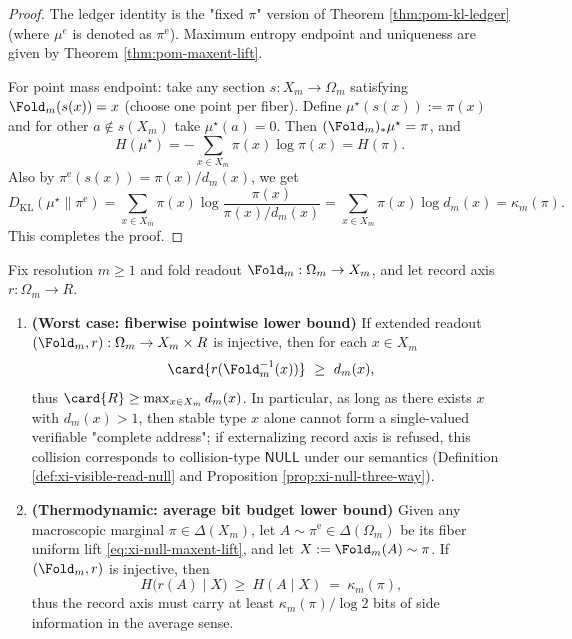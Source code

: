 \begin{proof}
The ledger identity is the "fixed \(\pi\)" version of Theorem \ref{thm:pom-kl-ledger} (where \(\mu^e\) is denoted as \(\pi^{\mathrm{e}}\)).
Maximum entropy endpoint and uniqueness are given by Theorem \ref{thm:pom-maxent-lift}.
\par
For point mass endpoint: take any section \(s:X_m\to\Omega_m\) satisfying \(\Fold_m(s(x))=x\) (choose one point per fiber).
Define
\(
\mu^\star(s(x)):=\pi(x)
\)
and for other \(a\notin s(X_m)\) take \(\mu^\star(a)=0\).
Then \((\Fold_m)_*\mu^\star=\pi\), and
\[
H(\mu^\star)=-\sum_{x\in X_m}\pi(x)\log\pi(x)=H(\pi).
\]
Also by \(\pi^{\mathrm{e}}(s(x))=\pi(x)/d_m(x)\), we get
\[
D_{\mathrm{KL}}(\mu^\star\|\pi^{\mathrm{e}})
=\sum_{x\in X_m}\pi(x)\log\frac{\pi(x)}{\pi(x)/d_m(x)}
=\sum_{x\in X_m}\pi(x)\log d_m(x)
=\kappa_m(\pi).
\]
This completes the proof.
\end{proof}

\begin{theorem}\label{thm:address-defect-law}
Fix resolution \(m\ge 1\) and fold readout \(\Fold_m:\Omega_m\to X_m\), and let record axis \(r:\Omega_m\to R\).
\begin{enumerate}
  \item \textbf{(Worst case: fiberwise pointwise lower bound)} If extended readout \((\Fold_m,r):\Omega_m\to X_m\times R\) is injective, then for each \(x\in X_m\)
  \[
  \card{r(\Fold_m^{-1}(x))}\ \ge\ d_m(x),
  \]
  thus \(\card{R}\ge \max_{x\in X_m} d_m(x)\).
  In particular, as long as there exists \(x\) with \(d_m(x)>1\), then stable type \(x\) alone cannot form a single-valued verifiable "complete address"; if externalizing record axis is refused, this collision corresponds to collision-type \(\mathsf{NULL}\) under our semantics (Definition \ref{def:xi-visible-read-null} and Proposition \ref{prop:xi-null-three-way}).

  \item \textbf{(Thermodynamic: average bit budget lower bound)} Given any macroscopic marginal \(\pi\in\Delta(X_m)\), let \(A\sim\pi^{\mathrm{e}}\in\Delta(\Omega_m)\) be its fiber uniform lift \eqref{eq:xi-null-maxent-lift}, and let \(X:=\Fold_m(A)\sim\pi\).
  If \((\Fold_m,r)\) is injective, then
  \[
  H\bigl(r(A)\mid X\bigr)\ \ge\ H(A\mid X)\ =\ \kappa_m(\pi),
  \]
  thus the record axis must carry at least \(\kappa_m(\pi)/\log 2\) bits of side information in the average sense.
\end{enumerate}
\end{theorem}

